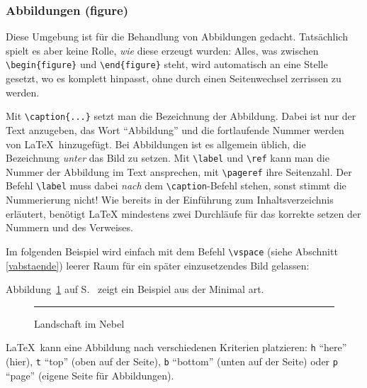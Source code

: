 \subsubsection{Abbildungen (figure)}
Diese Umgebung ist für die Behandlung von Abbildungen gedacht.
Tatsächlich spielt es aber keine Rolle, \emph{wie} diese erzeugt wurden:
Alles, was zwischen
\lstinline|\begin{figure}| und \lstinline|\end{figure}|
steht, wird automatisch an eine Stelle
gesetzt, wo es komplett hinpasst, ohne durch einen Seitenwechsel
zerrissen zu werden.

Mit \lstinline|\caption{...}| setzt man die Bezeichnung der Abbildung.
Dabei ist nur der Text anzugeben, das Wort "`Abbildung"' und die
fortlaufende Nummer werden von \LaTeX\ hinzugefügt.
Bei Abbildungen ist es allgemein üblich, die Bezeichnung
\emph{unter} das Bild zu setzen.
Mit \lstinline|\label| und \lstinline|\ref| kann man die Nummer der
Abbildung im Text ansprechen, mit \lstinline|\pageref| ihre Seitenzahl.
Der Befehl \lstinline:\label: muss dabei \emph{nach} dem \lstinline:\caption:-Befehl
stehen, sonst stimmt die Nummerierung nicht! Wie bereits in der Einführung zum Inhaltsverzeichnis
erläutert, benötigt \LaTeX{} mindestens zwei Durchläufe für das korrekte setzen der Nummern und
des Verweises.

Im folgenden Beispiel wird einfach mit dem Befehl \lstinline|\vspace|
(siehe Abschnitt \ref{vabstaende})
leerer Raum für ein später einzusetzendes Bild gelassen:

\begin{LTXexample}[preset=\let\label\origlabel]
Abbildung~\ref{weiss} auf
S.~\pageref{weiss} zeigt
ein Beispiel aus der 
Minimal art.
\begin{figure}[!htb]
\centering
\rule{3cm}{1cm}
\caption{Landschaft im
Nebel} \label{weiss}
\end{figure}
\end{LTXexample}


\LaTeX\ kann eine Abbildung nach verschiedenen Kriterien platzieren:
\texttt{h} "`here"' (hier),
\texttt{t} "`top"' (oben auf der Seite), \texttt{b} "`bottom"' (unten
auf der Seite) oder \texttt{p} "`page"' (eigene Seite für
Abbildungen).

